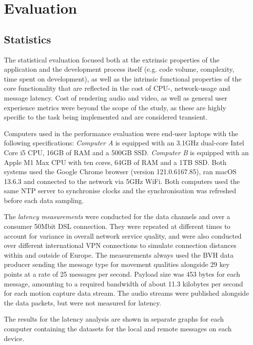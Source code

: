 \chapter{Evaluation}
\label{ch:evaluation}


\section{Statistics}
\label{sec:statistics}

The statistical evaluation focused both at the extrinsic properties of the application and the development process itself (e.g. code volume, complexity, time spent on development), as well as the intrinsic functional properties of the core functionality that are reflected in the cost of \ac{CPU}-, network-usage and message latency.
Cost of rendering audio and video, as well as general user experience metrics were beyond the scope of the study, as these are highly specific to the task being implemented and are considered transient.

Computers used in the performance evaluation were end-user laptops with the following specifications: \emph{Computer A} is equipped with an 3.1GHz dual-core Intel Core i5 \ac{CPU}, 16GB of \ac{RAM} and a 500GB \ac{SSD}.
\emph{Computer B} is equipped with an Apple M1 Max \ac{CPU} with ten cores, 64GB of \ac{RAM} and a 1TB \ac{SSD}.
Both systems used the Google Chrome browser (version 121.0.6167.85), ran macOS 13.6.3 and connected to the network via 5GHz WiFi.
Both computers used the same \ac{NTP} server to synchronise clocks and the synchronisation was refreshed before each data sampling.

The \emph{latency measurements} were conducted for the data channels and over a consumer 50Mbit \ac{DSL} connection.
They were repeated at different times to account for variance in overall network service quality, and were also conducted over different international \ac{VPN} connections to simulate connection distances within and outside of Europe.
The measurements always used the \ac{BVH} data producer sending the message type for movement qualities alongside 29 key points at a rate of 25 messages per second.
Payload size was 453 bytes for each message, amounting to a required bandwidth of about 11.3 kilobytes per second for each motion capture data stream.
The audio streams were published alongside the data packets, but were not measured for latency.

The results for the latency analysis are shown in separate graphs for each computer containing the datasets for the local and remote messages on each device.

